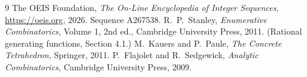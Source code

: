 \documentclass[11pt,a4paper]{article}
\theoremstyle{plain}
\theoremstyle{definition}
\begin{document}
\begin{thebibliography}{9}
 The OEIS Foundation, \emph{The On-Line Encyclopedia of Integer
Sequences}, \url{https://oeis.org}, 2026. Sequence A267538.
 R.~P.~Stanley, \emph{Enumerative Combinatorics}, Volume 1, 2nd ed.,
Cambridge University Press, 2011. (Rational generating functions, Section 4.1.)
 M.~Kauers and P.~Paule, \emph{The Concrete Tetrahedron}, Springer, 2011.
 P.~Flajolet and R.~Sedgewick, \emph{Analytic Combinatorics}, Cambridge
University Press, 2009.
\end{thebibliography}
\end{document}
